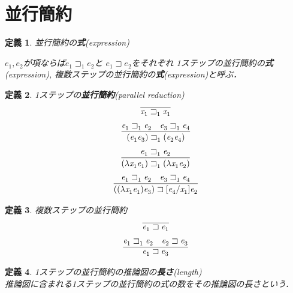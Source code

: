 \documentclass{ltjsbook}%
\newtheorem{definition}{定義}[section]%
\newcommand\term[2]{\textbf{#1}{(\textit{#2})}}%
\begin{document}
\section{並行簡約}%
\label{sect:par}%
\begin{definition}%
並行簡約の\term{式}{expression}%
\par$\mathit{e}_1^{},\mathit{e}_2^{}$が項ならば$\mathit{e}_1^{}\sqsupset_1^{}\mathit{e}_2^{}$と%
$\mathit{e}_1^{}\sqsupset\mathit{e}_2^{}$をそれぞれ%
1ステップの並行簡約の\term{式}{expression},%
複数ステップの並行簡約の\term{式}{expression}と呼ぶ．%
\end{definition}%
\begin{definition}%
1ステップの\term{並行簡約}{parallel reduction}%
\begin{equation}%
  \infer{%
    \mathit{x}_1^{}\sqsupset_1^{}\mathit{x}_1^{}%
  }{%
  }%
\end{equation}%
\begin{equation}%
  \infer{%
    (\mathit{e}_1^{}\mathit{e}_3^{})\sqsupset_1^{}(\mathit{e}_2^{}\mathit{e}_4^{})%
  }{%
    \mathit{e}_1^{}\sqsupset_1^{}\mathit{e}_2^{}%
  &%
    \mathit{e}_3^{}\sqsupset_1^{}\mathit{e}_4^{}%
  }%
\end{equation}%
\begin{equation}%
  \infer{%
    (\lambda\mathit{x}_1^{}\mathit{e}_1^{})\sqsupset_1^{}%
    (\lambda\mathit{x}_1^{}\mathit{e}_2^{})%
  }{%
    \mathit{e}_1^{}\sqsupset_1^{}\mathit{e}_2^{}%
  }%
\end{equation}%
\begin{equation}%
  \infer{%
    ((\lambda\mathit{x}_1^{}\mathit{e}_1^{})\mathit{e}_3^{})\sqsupset%
    [\mathit{e}_4^{}/\mathit{x}_1^{}]\mathit{e}_2^{}%
  }{%
    \mathit{e}_1^{}\sqsupset_1^{}\mathit{e}_2^{}%
  &%
    \mathit{e}_3^{}\sqsupset_1^{}\mathit{e}_4^{}%
  }%
\end{equation}%
\end{definition}%
\begin{definition}%
複数ステップの並行簡約%
\begin{equation}%
  \infer{%
    \mathit{e}_1^{}\sqsupset\mathit{e}_1^{}%
  }{%
  }%
\end{equation}%
\begin{equation}%
  \infer{%
    \mathit{e}_1^{}\sqsupset\mathit{e}_3^{}%
  }{%
    \mathit{e}_1^{}\sqsupset_1^{}\mathit{e}_2^{}%
  &%
    \mathit{e}_2^{}\sqsupset\mathit{e}_3^{}%
  }%
\end{equation}%
\end{definition}%
\begin{definition}%
  1ステップの並行簡約の推論図の\term{長さ}{length}\\%
  推論図に含まれる1ステップの並行簡約の式の数をその推論図の長さという．%
\end{definition}%
\end{document}
